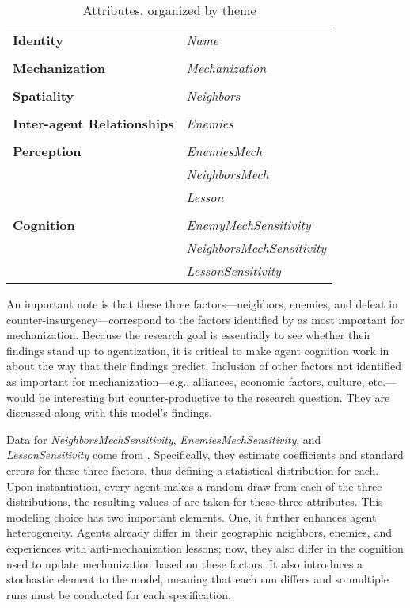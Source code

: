 \documentclass{article}
\begin{document}
\begin{table}[h]
	\centering
	\caption{Attributes, organized by theme}
	\begin{tabular}{|l l|}
		\hline
		\textbf{Identity} & \textit{Name} \\
		& \\
		\textbf{Mechanization} & \textit{Mechanization} \\
		& \\
		\textbf{Spatiality} & \textit{Neighbors} \\
		& \\
		\textbf{Inter-agent Relationships} & \textit{Enemies} \\
		& \\
		\textbf{Perception} & \textit{EnemiesMech} \\
		& \textit{NeighborsMech} \\
		& \textit{Lesson} \\
		& \\
		\textbf{Cognition} & \textit{EnemyMechSensitivity} \\
		& \textit{NeighborsMechSensitivity} \\
		& \textit{LessonSensitivity} \\
		\hline
	\end{tabular}
\end{table}

An important note is that these three factors---neighbors, enemies, and
defeat in counter-insurgency---correspond to the factors identified by 
\citet{sechser2010army} as most important for mechanization. Because the research
goal is essentially to see whether their findings stand up to agentization,
it is critical to make agent cognition work in about the way that their findings
predict. Inclusion of other factors not identified as important for
mechanization---e.g., alliances, economic factors,
culture, etc.---would be interesting but counter-productive to the research
question. They are discussed along with this model's findings. 

Data for \textit{NeighborsMechSensitivity}, \textit{EnemiesMechSensitivity}, and
\textit{LessonSensitivity} come from \citet{sechser2010army}. Specifically, they
estimate coefficients and standard errors for these three factors, thus defining
a statistical distribution for each. Upon instantiation, every agent makes a
random draw from each of the three distributions, the resulting values of are
taken for these three attributes. This modeling choice has two important
elements. One, it further enhances agent heterogeneity. Agents already differ in
their geographic neighbors, enemies, and experiences with anti-mechanization
lessons; now, they also differ in the cognition used to update mechanization
based on these factors. It also introduces a stochastic element to the
model, meaning that each run differs and so multiple runs must be conducted for
each specification.
\end{document}
